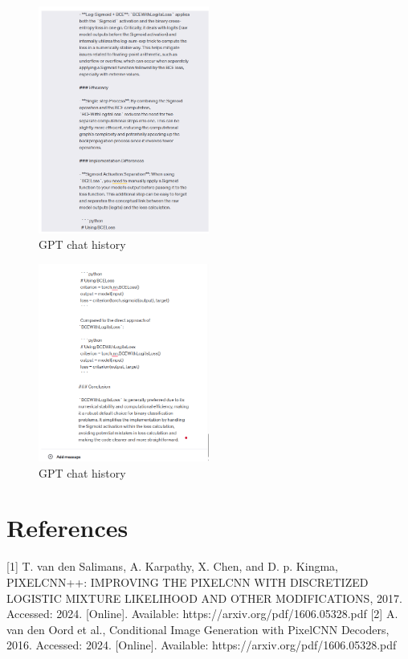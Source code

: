 \documentclass{article}
\begin{document}
\begin{figure}
    \centering
    \includegraphics[width=0.5\textwidth]{report_data/g-11.png}
    \caption{GPT chat history}
\end{figure}


\begin{figure}[H]
    \centering
    \includegraphics[width=0.5\textwidth]{report_data/g-12.png}
    \caption{GPT chat history}
\end{figure}

\section*{References}
[1] T. van den Salimans, A. Karpathy, X. Chen, and D. p. Kingma, PIXELCNN++: IMPROVING THE PIXELCNN WITH DISCRETIZED LOGISTIC MIXTURE LIKELIHOOD AND OTHER MODIFICATIONS, 2017. Accessed: 2024. [Online]. Available: https://arxiv.org/pdf/1606.05328.pdf
[2] A. van den Oord et al., Conditional Image Generation with PixelCNN Decoders, 2016. Accessed: 2024. [Online]. Available: https://arxiv.org/pdf/1606.05328.pdf
\end{document}
